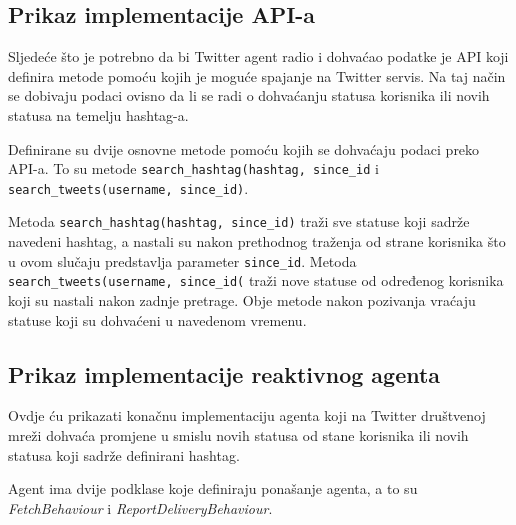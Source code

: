 \documentclass[a4paper,12pt]{foi}
\begin{document}
\lstset{commentstyle=\textit,language=python}


\subsection{Prikaz implementacije API-a}

Sljedeće što je potrebno da bi Twitter agent radio i dohvaćao podatke je API koji definira metode pomoću kojih je moguće spajanje na Twitter servis. Na taj način se dobivaju podaci ovisno da li se radi o dohvaćanju statusa korisnika ili novih statusa na temelju hashtag-a.

\lstset{commentstyle=\textit,language=python}


Definirane su dvije osnovne metode pomoću kojih se dohvaćaju podaci preko API-a. To su metode \texttt{search\_hashtag(hashtag, since\_id} i \texttt{search\_tweets(username, since\_id)}.

Metoda \texttt{search\_hashtag(hashtag, since\_id)} traži sve statuse koji sadrže navedeni hashtag, a nastali su nakon prethodnog traženja od strane korisnika što u ovom slučaju predstavlja parameter \texttt{since\_id}. Metoda \texttt{search\_tweets(username, since\_id(} traži nove statuse od određenog korisnika koji su nastali nakon zadnje pretrage. Obje metode nakon pozivanja vraćaju statuse koji su dohvaćeni u navedenom vremenu.

\subsection{Prikaz implementacije reaktivnog agenta}

Ovdje ću prikazati konačnu implementaciju agenta koji na Twitter društvenoj mreži dohvaća promjene u smislu novih statusa od stane korisnika ili novih statusa koji sadrže definirani hashtag.

\lstset{commentstyle=\textit,language=python}


Agent ima dvije podklase koje definiraju ponašanje agenta, a to su \textit{FetchBehaviour} i \textit{ReportDeliveryBehaviour}.
\end{document}

